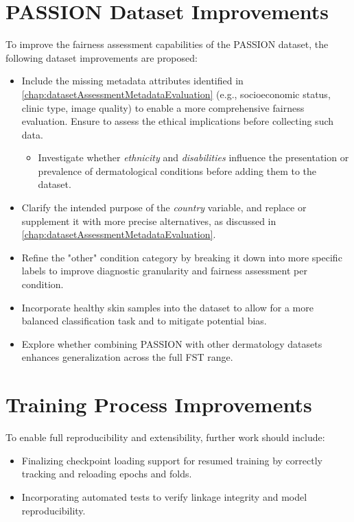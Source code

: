 \documentclass[12pt, a4paper, oneside]{book}   	%
\begin{document}
		
		\section{PASSION Dataset Improvements}
		To improve the fairness assessment capabilities of the PASSION dataset, the following dataset improvements are proposed:
		\begin{itemize}
			\item Include the missing metadata attributes identified in \autoref{chap:datasetAssessmentMetadataEvaluation} (e.g., socioeconomic status, clinic type, image quality) to enable a more comprehensive fairness evaluation. Ensure to assess the ethical implications before collecting such data.
			\begin{itemize}
				\item Investigate whether \textit{ethnicity} and \textit{disabilities} influence the presentation or prevalence of dermatological conditions before adding them to the dataset.
			\end{itemize}
						
			\item Clarify the intended purpose of the \textit{country} variable, and replace or supplement it with more precise alternatives, as discussed in \autoref{chap:datasetAssessmentMetadataEvaluation}.
			
			\item Refine the "other" condition category by breaking it down into more specific labels to improve diagnostic granularity and fairness assessment per condition.
			
			\item Incorporate healthy skin samples into the dataset to allow for a more balanced classification task and to mitigate potential bias.
			
			\item Explore whether combining PASSION with other dermatology datasets enhances generalization across the full \gls{FST} range.
		\end{itemize}
		
		
		\section{Training Process Improvements}
		To enable full reproducibility and extensibility, further work should include:
		
		\begin{itemize}
			\item Finalizing checkpoint loading support for resumed training by correctly tracking and reloading epochs and folds.
			\item Incorporating automated tests to verify linkage integrity and model reproducibility.
		\end{itemize}
		
\end{document}
